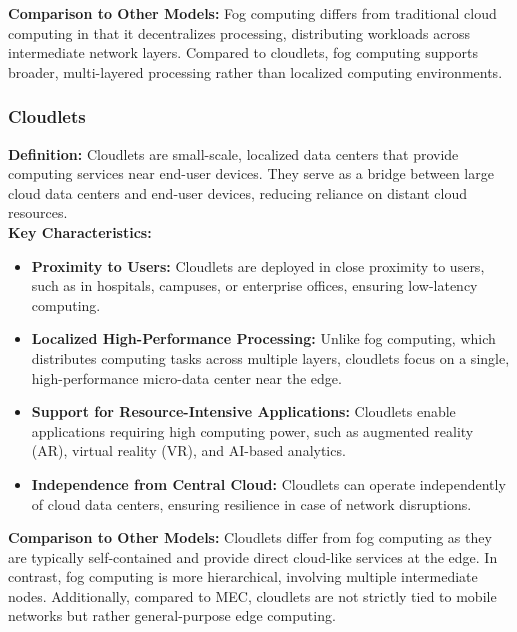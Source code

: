 \documentclass[runningheads]{llncs}
\begin{document}
\textbf{Comparison to Other Models:}  
Fog computing differs from traditional cloud computing in that it decentralizes processing, distributing workloads across intermediate network layers. Compared to cloudlets, fog computing supports broader, multi-layered processing rather than localized computing environments.

\subsubsection{Cloudlets}
\textbf{Definition:}  
Cloudlets are small-scale, localized data centers that provide computing services near end-user devices. They serve as a bridge between large cloud data centers and end-user devices, reducing reliance on distant cloud resources.
\\
\textbf{Key Characteristics:}
\begin{itemize}
    \item \textbf{Proximity to Users:} Cloudlets are deployed in close proximity to users, such as in hospitals, campuses, or enterprise offices, ensuring low-latency computing.
    \item \textbf{Localized High-Performance Processing:} Unlike fog computing, which distributes computing tasks across multiple layers, cloudlets focus on a single, high-performance micro-data center near the edge.
    \item \textbf{Support for Resource-Intensive Applications:} Cloudlets enable applications requiring high computing power, such as augmented reality (AR), virtual reality (VR), and AI-based analytics.
    \item \textbf{Independence from Central Cloud:} Cloudlets can operate independently of cloud data centers, ensuring resilience in case of network disruptions.
\end{itemize}

\textbf{Comparison to Other Models:}  
Cloudlets differ from fog computing as they are typically self-contained and provide direct cloud-like services at the edge. In contrast, fog computing is more hierarchical, involving multiple intermediate nodes. Additionally, compared to MEC, cloudlets are not strictly tied to mobile networks but rather general-purpose edge computing.
\end{document}
